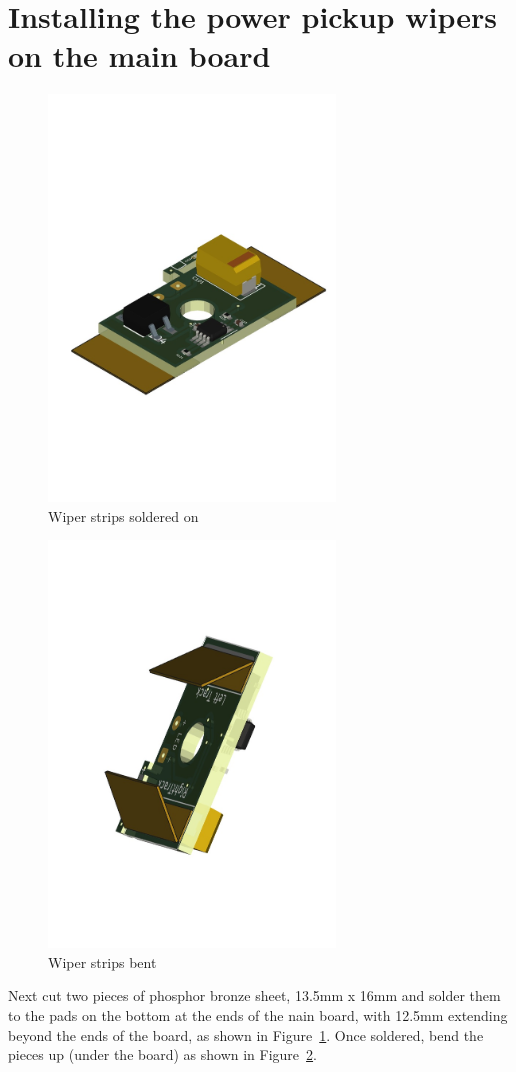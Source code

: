 \documentclass[12pt,twoside,letterpaper]{article}
\begin{document}
\section{Installing the power pickup wipers on the main board}

\begin{figure}[hbpt]\begin{centering}%
\includegraphics[width=3in]{FRED_with_wipers_not_bent.png}
\caption{Wiper strips soldered on}
\label{fig:FRED_with_wipers_not_bent}
\end{centering}\end{figure}
\begin{figure}[hbpt]\begin{centering}%
\includegraphics[width=3in]{FRED_with_wipers_bent.png}
\caption{Wiper strips bent}
\label{fig:FRED_with_wipers_bent}
\end{centering}\end{figure}
Next cut two pieces of phosphor bronze sheet, 13.5mm x 16mm and solder them to
the pads on the bottom at the ends of the nain board, with 12.5mm extending
beyond the ends of the board, as shown in
Figure~\ref{fig:FRED_with_wipers_not_bent}. Once soldered, bend the pieces up
(under the board) as shown in Figure~\ref{fig:FRED_with_wipers_bent}.
\end{document}
